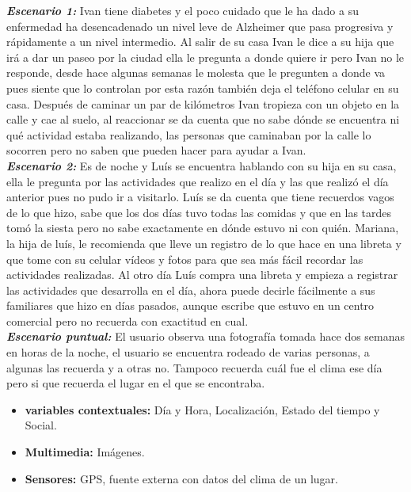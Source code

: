 \textbf{\textit{Escenario 1:}} Ivan tiene diabetes y el poco cuidado que le ha dado a su enfermedad ha desencadenado un nivel leve de Alzheimer que pasa progresiva y rápidamente a un nivel intermedio. Al salir de su casa Ivan le dice a su hija que irá a dar un paseo por la ciudad ella le pregunta a donde quiere ir pero Ivan no le responde, desde hace algunas semanas le molesta que le pregunten a donde va pues siente que lo controlan por esta razón también deja el teléfono celular en su casa.
Después de caminar un par de kilómetros Ivan tropieza con un objeto en la calle y cae al suelo, al reaccionar se da cuenta que no sabe dónde se encuentra ni qué actividad estaba realizando, las personas que caminaban por la calle lo socorren pero no saben que pueden hacer para ayudar a Ivan.\\

\textbf{\textit{Escenario 2:}} Es de noche y Luís se encuentra hablando con su hija en su casa, ella le pregunta por las actividades que realizo en el día y las que realizó el día anterior pues no pudo ir a visitarlo. Luís se da cuenta que tiene recuerdos vagos de lo que hizo, sabe que los dos días tuvo todas las comidas y que en las tardes tomó la siesta pero no sabe exactamente en dónde estuvo ni con quién.
Mariana, la hija de luís, le recomienda que lleve un registro de lo que hace en una libreta y que tome con su celular vídeos y fotos para que sea más fácil recordar las actividades realizadas. Al otro día Luís compra una libreta y empieza a registrar las actividades que desarrolla en el día, ahora puede decirle fácilmente a sus familiares que hizo en días pasados, aunque escribe que estuvo en un centro comercial pero no recuerda con exactitud en cual.\\

\textbf{\textit{Escenario puntual:}} El usuario observa una fotografía tomada hace dos semanas en horas de la noche, el usuario se encuentra rodeado de varias personas, a algunas las recuerda y a otras no. Tampoco recuerda cuál fue el clima ese día pero si que recuerda el lugar en el que se encontraba.\\
\begin{itemize}
\item \textbf{variables contextuales:} Día y Hora, Localización, Estado del tiempo y Social.
\item \textbf{Multimedia:} Imágenes.
\item \textbf{Sensores:} GPS, fuente externa con datos del clima de un lugar.
\end{itemize}



